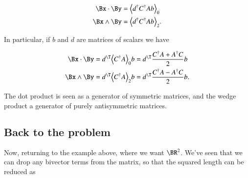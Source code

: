 \begin{align}\label{eqn:matrixVectorPotentials:170}
\Bx \cdot \By &= \gpgradezero{ d^\dagger C^\dagger A b } \\
\Bx \wedge \By &= \gpgradetwo{ d^\dagger C^\dagger A b }.
\end{align}

In particular, if $b$ and $d$ are matrices of scalars we have

\begin{align}\label{eqn:matrixVectorPotentials:190}
\Bx \cdot \By &= d^\T \gpgradezero{C^\dagger A} b = d^\T \frac{C^\dagger A + A^\dagger C}{2} b \\
\Bx \wedge \By &= d^\T \gpgradetwo{C^\dagger A} b = d^\T \frac{C^\dagger A - A^\dagger C}{2} b.
\end{align}

The dot product is seen as a generator of symmetric matrices, and the wedge product a generator of purely antisymmetric matrices.

\subsection{Back to the problem}

Now, returning to the example above, where we want $\BR^2$.  We've seen that we can drop any bivector terms from the matrix, so that the squared length can be reduced as

